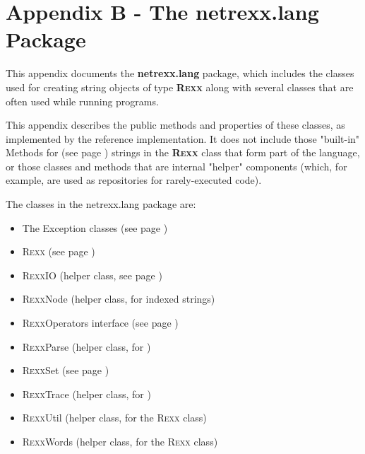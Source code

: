 \chapter{Appendix B - The netrexx.lang Package}\label{refappc}
 
This appendix documents the \textbf{netrexx.lang}
package, which includes the classes used for creating string objects of
type \textbf{R\textsc{exx}} along with several classes that are often used
while running \nr{} programs.
 
This appendix describes the public methods and properties of these
classes, as implemented by the reference implementation.  It does not
include those "built-in"  Methods for \nr{} (see page \pageref{refbmeth}) 
strings in the \textbf{R\textsc{exx}} class that form part of the
\nr{} language, or those classes and methods that are internal
"helper" components (which, for example, are used as
repositories for rarely-executed code).
 
The classes in the netrexx.lang package are:
\begin{itemize}
\item The  Exception classes (see page \pageref{refnlexcep}) 
\item  R\textsc{exx} (see page \pageref{refnlrexx}) 
\item R\textsc{exx}IO (helper class, see page \pageref{refrexxio})
\item R\textsc{exx}Node (helper class, for indexed strings)
\item  R\textsc{exx}Operators interface (see page \pageref{refnlrops}) 
\item R\textsc{exx}Parse (helper class, for )
\item  R\textsc{exx}Set (see page \pageref{refnlrset}) 
\item R\textsc{exx}Trace (helper class, for )
\item R\textsc{exx}Util (helper class, for the R\textsc{exx} class)
\item R\textsc{exx}Words (helper class, for the R\textsc{exx} class)
\end{itemize}
